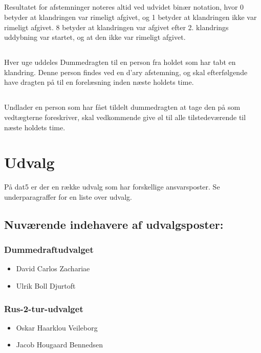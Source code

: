 \documentclass{article}
\begin{document}
	\subsection{}
	Resultatet for afstemninger noteres altid ved udvidet binær notation, hvor 0 betyder at klandringen var rimeligt afgivet, og 1 betyder at klandringen ikke var rimeligt afgivet. 8 betyder at klandringen var afgivet efter 2. klandrings uddybning var startet, og at den ikke var rimeligt afgivet.
	\subsection{}
	Hver uge uddeles Dummedragten til en person fra holdet som har tabt en klandring. Denne person findes ved en d'ary afstemning, og skal efterfølgende have dragten på til en forelæsning inden næste holdets time.
	\subsection{}
	Undlader en person som har fået tildelt dummedragten at tage den på som vedtægterne foreskriver, skal vedkommende give øl til alle tilstedeværende til næste holdets time.

	\section{Udvalg}
	På dat5 er der en række udvalg som har forskellige ansvarsposter. Se underparagraffer for en liste over udvalg.
	\subsection{Nuværende indehavere af udvalgsposter:}
	\subsubsection{Dummedraftudvalget}
	\begin{itemize}
		\item David Carlos Zachariae
		\item Ulrik Boll Djurtoft
	\end{itemize}
	\subsubsection{Rus-2-tur-udvalget}
	\begin{itemize}
		\item Oskar Haarklou Veileborg
		\item Jacob Hougaard Bennedsen
	\end{itemize}
\end{document}

